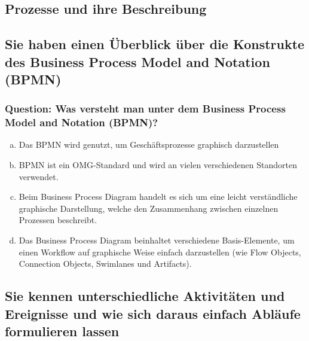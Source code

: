 \documentclass{article}
\begin{document}
\begin{adjustwidth}{2em}{2em}
		\newpage
			
		\section{Prozesse und ihre Beschreibung}
		\begin{adjustwidth}{2em}{2em}
			\subsection{Sie haben einen Überblick über die Konstrukte des Business Process Model and Notation (BPMN)}
			\begin{adjustwidth}{1em}{}
				\subsubsection*{Question: Was versteht man unter dem Business Process Model and Notation (BPMN)?}
				\begin{adjustwidth}{1em}{}
					\begin{enumerate}[(a)]
						\item Das BPMN wird genutzt, um Geschäftsprozesse graphisch darzustellen
						\item BPMN ist ein OMG-Standard und wird an vielen verschiedenen Standorten verwendet.
						\item Beim Business Process Diagram handelt es sich um eine leicht verständliche graphische Darstellung, welche den Zusammenhang zwischen einzelnen Prozessen beschreibt.
						\item Das Business Process Diagram beinhaltet verschiedene Basis-Elemente, um einen Workflow auf graphische Weise einfach darzustellen (wie Flow Objects, Connection Objects, Swimlanes und Artifacts).
					\end{enumerate}
				\end{adjustwidth}
			\end{adjustwidth}
			\subsection{Sie kennen unterschiedliche Aktivitäten und Ereignisse und wie sich daraus einfach Abläufe formulieren lassen}
			\begin{adjustwidth}{1em}{}

\end{adjustwidth}
\end{adjustwidth}
\end{adjustwidth}
\end{document}
